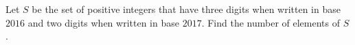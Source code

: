 Let $S$ be the set of positive integers that have three digits when written in base $2016$ and two digits when written in base $2017$. Find the number of elements of $S$.
